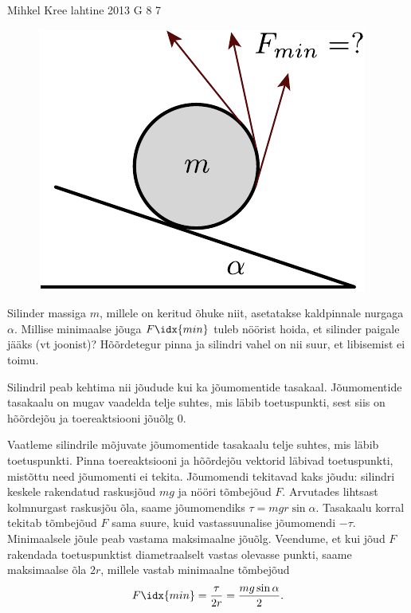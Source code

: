 {Mihkel Kree} %
{lahtine} %
{2013} %
{G 8} %
{7} %
{
\ifStatement
\begin{figure}
\vspace{-15pt}
\includegraphics[width=\linewidth]{2013-lahg-08-joonis_niidirull-crop}
\end{figure}

Silinder massiga $m$, millele on keritud õhuke niit, asetatakse kaldpinnale nurgaga $\alpha$.
Millise minimaalse jõuga $F\idx{min}$ tuleb nöörist hoida, et silinder paigale
jääks (vt joonist)? Hõõrdetegur pinna ja silindri vahel on nii suur, et
libisemist ei toimu.
\fi


\ifHint
Silindril peab kehtima nii jõudude kui ka jõumomentide tasakaal.  Jõumomentide tasakaalu on mugav vaadelda telje suhtes, mis läbib toetuspunkti, sest siis on hõõrdejõu ja toereaktsiooni jõuõlg \num{0}.
\fi


\ifSolution
Vaatleme silindrile mõjuvate jõumomentide tasakaalu telje suhtes, mis läbib toetuspunkti. Pinna toereaktsiooni ja hõõrdejõu vektorid läbivad toetuspunkti, mistõttu need jõumomenti ei tekita. Jõumomendi tekitavad kaks jõudu: silindri keskele rakendatud raskusjõud $mg$ ja nööri tõmbejõud $F$. Arvutades lihtsast kolmnurgast raskusjõu õla, saame jõumomendiks $\tau=mgr\sin\alpha$. Tasakaalu korral tekitab tõmbejõud $F$ sama suure, kuid vastassuunalise jõumomendi $-\tau$. Minimaalsele jõule peab vastama maksimaalne jõuõlg. Veendume, et kui jõud $F$ rakendada toetuspunktist diametraalselt vastas olevasse punkti, saame maksimaalse õla $2r$, millele vastab minimaalne tõmbejõud
\[F\idx{min}=\frac{\tau}{2r}=\frac{mg\sin\alpha}{2}.\]
\fi


}

